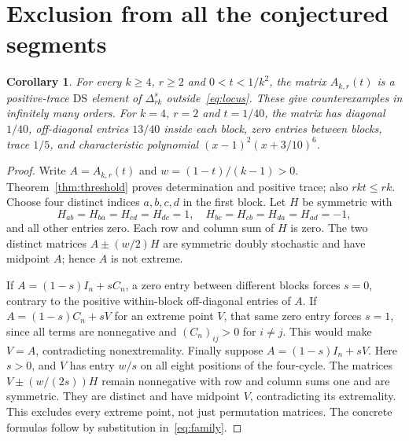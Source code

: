 \documentclass[11pt]{article}
\newtheorem{corollary}[theorem]{Corollary}
\newcommand{\DS}{\mathrm{DS}}
\newcommand{\Del}{\Delta}
\begin{document}
\section{Exclusion from all the conjectured segments}
\begin{corollary}\label{cor:refutation}
For every $k\geq4$, $r\geq2$ and $0<t<1/k^2$, the matrix $A_{k,r}(t)$ is a positive-trace $\DS$ element of $\Del_{rk}^s$ outside~\eqref{eq:locus}. These give counterexamples in infinitely many orders. For $k=4$, $r=2$ and $t=1/40$, the matrix has diagonal $1/40$, off-diagonal entries $13/40$ inside each block, zero entries between blocks, trace $1/5$, and characteristic polynomial $(x-1)^2(x+3/10)^6$.
\end{corollary}
\begin{proof}
Write $A=A_{k,r}(t)$ and $w=(1-t)/(k-1)>0$. Theorem~\ref{thm:threshold} proves determination and positive trace; also $rkt\leq rk$.
Choose four distinct indices $a,b,c,d$ in the first block. Let $H$ be symmetric with
\[
 H_{ab}=H_{ba}=H_{cd}=H_{dc}=1,\quad
 H_{bc}=H_{cb}=H_{da}=H_{ad}=-1,
\]
and all other entries zero. Each row and column sum of $H$ is zero. The two distinct matrices $A\pm(w/2)H$ are symmetric doubly stochastic and have midpoint $A$; hence $A$ is not extreme.

If $A=(1-s)I_n+sC_n$, a zero entry between different blocks forces $s=0$, contrary to the positive within-block off-diagonal entries of $A$.
If $A=(1-s)C_n+sV$ for an extreme point $V$, that same zero entry forces $s=1$, since all terms are nonnegative and $(C_n)_{ij}>0$ for $i\ne j$. This would make $V=A$, contradicting nonextremality.
Finally suppose $A=(1-s)I_n+sV$. Here $s>0$, and $V$ has entry $w/s$ on all eight positions of the four-cycle. The matrices $V\pm(w/(2s))H$ remain nonnegative with row and column sums one and are symmetric. They are distinct and have midpoint $V$, contradicting its extremality. This excludes every extreme point, not just permutation matrices.
The concrete formulas follow by substitution in~\eqref{eq:family}.
\end{proof}

\clearpage
\end{document}
